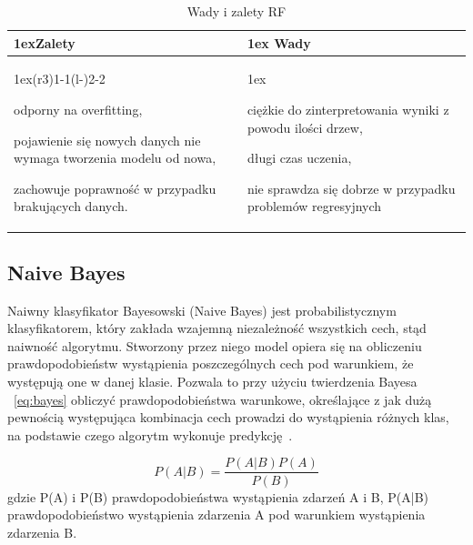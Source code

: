 \begin{table}[H]
    \begin{tabularx}{\linewidth}{>{\parskip1ex}X@{\kern4\tabcolsep}>{\parskip1ex}X}
    \toprule
    \hfil\bfseries Zalety
    &
    \hfil\bfseries Wady
    \\\cmidrule(r{3\tabcolsep}){1-1}\cmidrule(l{-\tabcolsep}){2-2}
    
    odporny na overfitting,\par
    pojawienie się nowych danych nie wymaga tworzenia modelu od nowa,\par
    zachowuje poprawność w przypadku brakujących danych.\par
    
    &
    
    ciężkie do zinterpretowania wyniki z powodu ilości drzew,\par
    długi czas uczenia,\par
    nie sprawdza się dobrze w przypadku problemów regresyjnych\par
    
    \\\bottomrule
    \end{tabularx}
    \caption{Wady i zalety RF}
\end{table}

\subsection{Naive Bayes}

Naiwny klasyfikator Bayesowski (Naive Bayes) jest probabilistycznym klasyfikatorem, który
zakłada wzajemną niezależność wszystkich cech, stąd naiwność algorytmu. Stworzony przez niego model
opiera się na obliczeniu prawdopodobieństw wystąpienia poszczególnych cech pod warunkiem, że 
występują one w danej klasie. Pozwala to przy użyciu twierdzenia Bayesa ~\ref{eq:bayes} obliczyć prawdopodobieństwa 
warunkowe, określające z jak dużą pewnością występująca kombinacja cech prowadzi do 
wystąpienia różnych klas, na podstawie czego algorytm wykonuje predykcję~\cite{MLAlgorithms}. 


\begin{equation}
    \label{eq:bayes}
    P(A|B) = \frac{P(A|B)P(A)}{P(B)}
\end{equation}
gdzie P(A) i P(B) prawdopodobieństwa wystąpienia zdarzeń A i B, P(A|B) prawdopodobieństwo wystąpienia
zdarzenia A pod warunkiem wystąpienia zdarzenia B.

